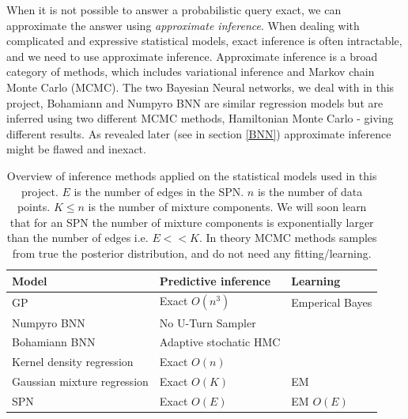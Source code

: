When it is not possible to answer a probabilistic query exact, we can approximate the answer using
\textit{approximate inference}. When dealing with complicated and expressive statistical models,
exact inference is often intractable, and we need to use approximate inference. Approximate
inference is a broad category of methods, which includes variational inference and Markov chain
Monte Carlo (MCMC). The two Bayesian Neural networks, we deal with in this project, Bohamiann and
Numpyro BNN are similar regression models but are inferred using two different MCMC methods,
Hamiltonian Monte Carlo - giving different results. As revealed later (see in section \ref{BNN})
approximate inference might be flawed and inexact. 

\begin{table}[H]
    \centering
    \begin{tabular}{l|l|l}
    \textbf{Model}       & \textbf{Predictive inference}    &   \textbf{Learning} \\ \hline
    GP                          & Exact $O(n^3)$            & Emperical Bayes\\
    Numpyro BNN                 & No U-Turn Sampler         & \\
    Bohamiann BNN               & Adaptive stochatic HMC    & \\
    Kernel density regression   & Exact $O(n)$              & \\
    Gaussian mixture regression & Exact $O(K)$              & EM  \\
    SPN                         & Exact $O(E)$              &  EM $O(E)$\\
    \end{tabular}
    \caption{Overview of inference methods applied on the statistical models used in this project.
            $E$ is the number of edges in the SPN. $n$ is the number of data points. $K \leq n$ is
            the number of mixture components. We will soon learn that for an SPN the number of
            mixture components is exponentially larger than the number of edges i.e. $E << K$. In theory
            MCMC methods samples from true the posterior distribution, and do not need any
            fitting/learning. }
\end{table}

\newpage
